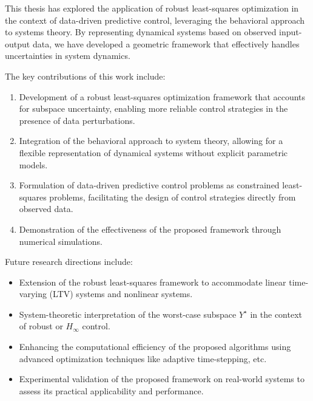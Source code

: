 

\label{ch:Summary}
\vspace{2ex}
This thesis has explored the application of robust least-squares optimization in the context of data-driven predictive control, leveraging the behavioral approach to systems theory. By representing dynamical systems based on observed input-output data, we have developed a geometric framework that effectively handles uncertainties in system dynamics.

The key contributions of this work include:
\begin{enumerate}
    \item Development of a robust least-squares optimization framework that accounts for subspace uncertainty, enabling more reliable control strategies in the presence of data perturbations.
    \item Integration of the behavioral approach to system theory, allowing for a flexible representation of dynamical systems without explicit parametric models.
    \item Formulation of data-driven predictive control problems as constrained least-squares problems, facilitating the design of control strategies directly from observed data.
    \item Demonstration of the effectiveness of the proposed framework through numerical simulations.
\end{enumerate}

Future research directions include:
\begin{itemize}
    \item Extension of the robust least-squares framework to accommodate linear time-varying (LTV) systems and nonlinear systems.
    \item System-theoretic interpretation of the worst-case subspace $Y^\star$ in the context of robust or $H_\infty$ control.
    \item Enhancing the computational efficiency of the proposed algorithms using advanced optimization techniques like adaptive time-stepping, etc.
    \item Experimental validation of the proposed framework on real-world systems to assess its practical applicability and performance.
\end{itemize}